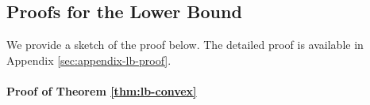 \subsection{Proofs for the Lower Bound}
\label{sec:lb-proof}
We provide a sketch of the proof below. The detailed proof is available in Appendix \ref{sec:appendix-lb-proof}.
\paragraph{Proof of Theorem \ref{thm:lb-convex}}



